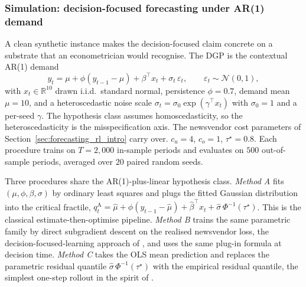 \subsubsection{Simulation: decision-focused forecasting under AR(1) demand}
\label{sec:forecasting_rl_sim}

A clean synthetic instance makes the decision-focused claim concrete on
a substrate that an econometrician would recognise. The DGP is the
contextual AR(1) demand
\begin{equation}
y_t = \mu + \phi (y_{t-1} - \mu) + \beta^\top x_t + \sigma_t\,
\varepsilon_t, \qquad \varepsilon_t \sim \mathcal N(0, 1),
\label{eq:ar1_dgp}
\end{equation}
with $x_t \in \mathbb R^{10}$ drawn i.i.d.\ standard normal, persistence
$\phi = 0.7$, demand mean $\mu = 10$, and a heteroscedastic noise
scale $\sigma_t = \sigma_0 \exp(\gamma^\top x_t)$ with $\sigma_0 = 1$
and a per-seed $\gamma$. The hypothesis class assumes homoscedasticity,
so the heteroscedasticity is the misspecification axis. The newsvendor
cost parameters of Section~\ref{sec:forecasting_rl_intro} carry over.
$c_u = 4$, $c_o = 1$, $\tau^\star = 0.8$. Each procedure trains on
$T = 2{,}000$ in-sample periods and evaluates on $500$ out-of-sample
periods, averaged over $20$ paired random seeds.

Three procedures share the AR(1)-plus-linear hypothesis class.
\emph{Method A} fits $(\mu, \phi, \beta, \sigma)$ by ordinary least
squares and plugs the fitted Gaussian distribution into the critical
fractile, $q^{\mathrm A}_t = \hat\mu + \hat\phi (y_{t-1} - \hat\mu) +
\hat\beta^\top x_t + \hat\sigma\, \Phi^{-1}(\tau^\star)$. This is the
classical estimate-then-optimise pipeline. \emph{Method B} trains the
same parametric family by direct subgradient descent on the realised
newsvendor loss, the decision-focused-learning approach of
\citet{DontiAmosKolter2017}, and uses the same plug-in formula at
decision time. \emph{Method
C} takes the OLS mean prediction and replaces the parametric residual
quantile $\hat\sigma\, \Phi^{-1}(\tau^\star)$ with the empirical
residual quantile, the simplest one-step rollout in the spirit of
\citet{BertsekasRollout2022}.

\begin{table}[h]
\centering
\caption{Decision-focused forecasting under AR(1) demand with
heteroscedastic noise, $20$ seeds, standard errors in parentheses.
Method B attains the same in-sample MSE as Method A but a factor-of-five
lower realised newsvendor regret.}
\label{tab:forecasting_rl_sim}

\end{table}

